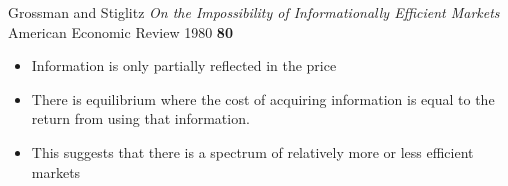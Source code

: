 \documentclass[14pt,xcolor=pdftex,dvipsnames,table]{beamer}
\begin{document}
\begin{frame}{Grossman and Stiglitz}
\emph{On the Impossibility of Informationally Efficient Markets}\\
American Economic Review 1980 \textbf{80}
\begin{itemize}[<+-| alert@+>]
\pause
\item Information is only partially reflected in the price
\item There is equilibrium where the cost of acquiring information is equal to the return from using that information. 
\item This suggests that there is a spectrum of relatively more or less efficient markets
\end{itemize}
\end{frame}
\end{document}
